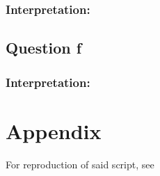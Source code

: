 \documentclass{article}
\begin{document}
\subsubsection*{Interpretation:}

\subsection*{Question f}
\subsubsection*{Interpretation:}

\section*{Appendix}



For reproduction of said script, see 
\end{document}
